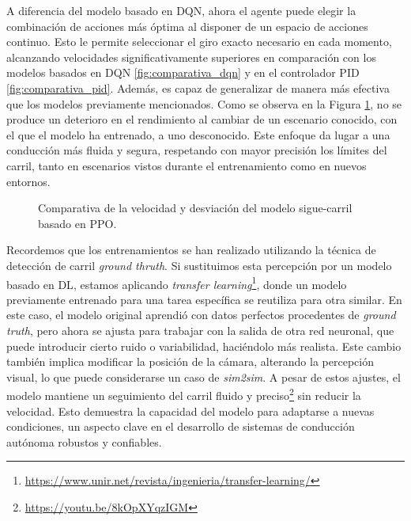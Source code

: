 A diferencia del modelo basado en \ac{DQN}, ahora el agente puede elegir la combinación de acciones más óptima al disponer de un espacio de acciones continuo. Esto le permite seleccionar el giro exacto necesario en cada momento, alcanzando velocidades significativamente superiores en comparación con los modelos basados en \ac{DQN} \ref{fig:comparativa_dqn} y en el controlador \ac{PID} \ref{fig:comparativa_pid}. Además, es capaz de generalizar de manera más efectiva que los modelos previamente mencionados. Como se observa en la Figura \ref{fig:comparativa_ppo}, no se produce un deterioro en el rendimiento al cambiar de un escenario conocido, con el que el modelo ha entrenado, a uno desconocido. Este enfoque da lugar a una conducción más fluida y segura, respetando con mayor precisión los límites del carril, tanto en escenarios vistos durante el entrenamiento como en nuevos entornos.

\begin{figure}[ht]
\centering
{}
\hfill
{}
\caption{Comparativa de la velocidad y desviación del modelo sigue-carril basado en \ac{PPO}.}
\label{fig:comparativa_ppo}
\end{figure}

Recordemos que los entrenamientos se han realizado utilizando la técnica de detección de carril \textit{ground thruth}. Si sustituimos esta percepción por un modelo basado en \ac{DL}, estamos aplicando \textit{transfer learning}\footnote{\url{https://www.unir.net/revista/ingenieria/transfer-learning/}}, donde un modelo previamente entrenado para una tarea específica se reutiliza para otra similar. En este caso, el modelo original aprendió con datos perfectos procedentes de \textit{ground truth}, pero ahora se ajusta para trabajar con la salida de otra red neuronal, que puede introducir cierto ruido o variabilidad, haciéndolo más realista. Este cambio también implica modificar la posición de la cámara, alterando la percepción visual, lo que puede considerarse un caso de \textit{sim2sim}. A pesar de estos ajustes, el modelo mantiene un seguimiento del carril fluido y preciso\footnote{\url{https://youtu.be/8kOpXYqzIGM}} sin reducir la velocidad. Esto demuestra la capacidad del modelo para adaptarse a nuevas condiciones, un aspecto clave en el desarrollo de sistemas de conducción autónoma robustos y confiables.

